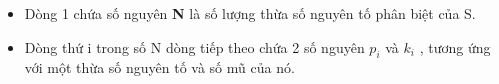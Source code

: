 \begin{itemize}
	\item     Dòng 1 chứa số nguyên    \textbf{     N    }    là số lượng thừa số nguyên tố phân biệt của S.   
	\item     Dòng thứ i trong số N dòng tiếp theo chứa 2 số nguyên    \textbf{     $p_{i}$}    và    \textbf{     $k_{i}$}    , tương ứng với một thừa số nguyên tố và số mũ của nó.   
\end{itemize}